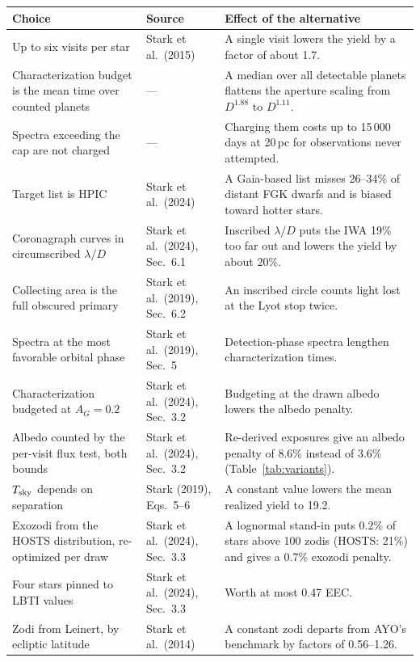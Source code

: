 \documentclass[11pt,a4paper]{article}
\begin{document}
\begin{table}[htbp]
\centering
\scriptsize
\begin{tabular}{p{4.2cm}p{3.6cm}p{7.4cm}}
\toprule
\textbf{Choice} & \textbf{Source} & \textbf{Effect of the alternative} \\
\midrule
Up to six visits per star & Stark et al.\ (2015) & A single visit lowers the yield by a factor of about 1.7. \\
Characterization budget is the mean time over counted planets & --- & A median over all detectable planets flattens the aperture scaling from $D^{1.88}$ to $D^{1.11}$. \\
Spectra exceeding the cap are not charged & --- & Charging them costs up to 15\,000 days at 20\,pc for observations never attempted. \\
Target list is HPIC & Stark et al.\ (2024) & A Gaia-based list misses 26--34\% of distant FGK dwarfs and is biased toward hotter stars. \\
Coronagraph curves in circumscribed $\lambda/D$ & Stark et al.\ (2024), Sec.~6.1 & Inscribed $\lambda/D$ puts the IWA 19\% too far out and lowers the yield by about 20\%. \\
Collecting area is the full obscured primary & Stark et al.\ (2019), Sec.~6.2 & An inscribed circle counts light lost at the Lyot stop twice. \\
Spectra at the most favorable orbital phase & Stark et al.\ (2019), Sec.~5 & Detection-phase spectra lengthen characterization times. \\
Characterization budgeted at $A_G = 0.2$ & Stark et al.\ (2024), Sec.~3.2 & Budgeting at the drawn albedo lowers the albedo penalty. \\
Albedo counted by the per-visit flux test, both bounds & Stark et al.\ (2024), Sec.~3.2 & Re-derived exposures give an albedo penalty of 8.6\% instead of 3.6\% (Table~\ref{tab:variants}). \\
$T_{\rm sky}$ depends on separation & Stark (2019), Eqs.~5--6 & A constant value lowers the mean realized yield to 19.2. \\
Exozodi from the HOSTS distribution, re-optimized per draw & Stark et al.\ (2024), Sec.~3.3 & A lognormal stand-in puts 0.2\% of stars above 100 zodis (HOSTS: 21\%) and gives a 0.7\% exozodi penalty. \\
Four stars pinned to LBTI values & Stark et al.\ (2024), Sec.~3.3 & Worth at most 0.47 EEC. \\
Zodi from Leinert, by ecliptic latitude & Stark et al.\ (2014) & A constant zodi departs from AYO's benchmark by factors of 0.56--1.26. \\

\end{tabular}
\end{table}
\end{document}
